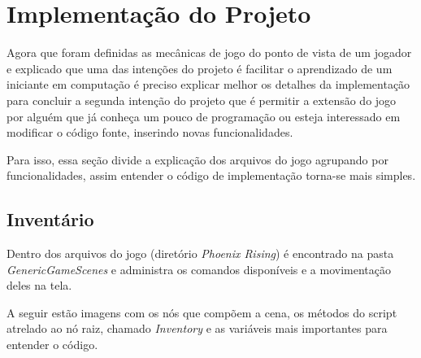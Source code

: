 
\chapter{Implementação do Projeto}
\label{cap:Implementação}

Agora que foram definidas as mecânicas de jogo do ponto de vista de um jogador e
explicado que uma das intenções do projeto é facilitar o aprendizado de um 
iniciante em computação é preciso explicar melhor os detalhes da implementação
para concluir a segunda intenção do projeto que é permitir a extensão do jogo
por alguém que já conheça um pouco de programação ou esteja interessado em 
modificar o código fonte, inserindo novas funcionalidades. 

Para isso, essa seção divide a explicação dos arquivos do jogo agrupando por 
funcionalidades, assim entender o código de implementação torna-se mais simples.

\section{Inventário}

Dentro dos arquivos do jogo (diretório \textit{Phoenix Rising}) é encontrado na 
pasta \textit{GenericGameScenes} e administra os comandos disponíveis e a
movimentação deles na tela.

A seguir estão imagens com os nós que compõem a cena, os métodos do script
atrelado ao nó raiz, chamado \textit{Inventory} e as variáveis mais importantes
para entender o código.


